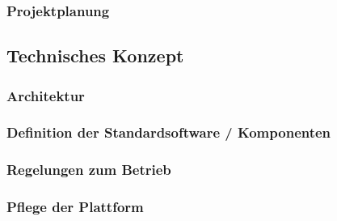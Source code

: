 \documentclass[a4paper,12pt]{article}
\begin{document}
				\subsubsection{Projektplanung}
				
        
        \subsection{Technisches Konzept} 		
				\subsubsection{Architektur}
				
				
				\subsubsection{Definition der Standardsoftware / Komponenten}
				
				
				\subsubsection{Regelungen zum Betrieb}
				
				
				\subsubsection{Pflege der Plattform}
				                				        
 	\clearpage
\end{document}
